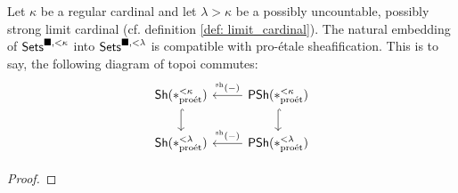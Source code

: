                 \begin{lemma} \label{lemma: large_condensed_sets}
                    Let $\kappa$ be a regular cardinal and let $\lambda > \kappa$ be a possibly uncountable, possibly strong limit cardinal (cf. definition \ref{def: limit_cardinal}). The natural embedding of $\mathsf{Sets}^{\blacksquare, < \kappa}$ into $\mathsf{Sets}^{\blacksquare, < \lambda}$ is compatible with pro-\'etale sheafification. This is to say, the following diagram of topoi commutes:
                        $$
                            \begin{tikzcd}
                            	{\Sh(*_{\proet}^{< \kappa})} & {\Psh(*_{\proet}^{< \kappa})} \\
                            	{\Sh(*_{\proet}^{< \lambda})} & {\Psh(*_{\proet}^{< \lambda})}
                            	\arrow[hook, from=1-1, to=2-1]
                            	\arrow[hook, from=1-2, to=2-2]
                            	\arrow["{{}^{\sh}(-)}"', from=1-2, to=1-1]
                            	\arrow["{{}^{\sh}(-)}"', from=2-2, to=2-1]
                            \end{tikzcd}
                        $$
                \end{lemma}
                    \begin{proof}
                        
                    \end{proof}
                
